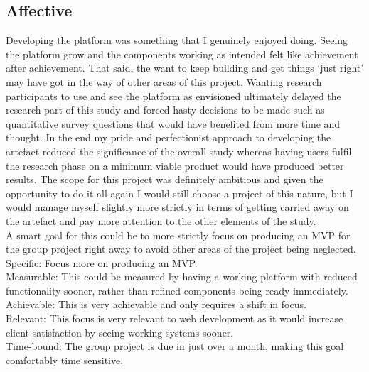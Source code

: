 \documentclass[lettersize,journal]{IEEEtran}
\begin{document}
\subsection{Affective}
Developing the platform was something that I genuinely enjoyed doing. Seeing the platform grow and the components working as intended felt like achievement after achievement. That said, the want to keep 
building and get things `just right' may have got in the way of other areas of this project. Wanting research participants to use and see the platform as envisioned ultimately delayed the 
research part of this study and forced hasty decisions to be made such as quantitative survey questions that would have benefited from more time and thought. In the end my pride and perfectionist 
approach to developing the artefact reduced the significance of the overall study whereas having users fulfil the research phase on a minimum viable product would have produced better results.
The scope for this project was definitely ambitious and given the opportunity to do it all again I would still choose a project of this nature, but I would manage myself slightly more strictly in terms 
of getting carried away on the artefact and pay more attention to the other elements of the study.\\ A smart goal for this could be to more strictly focus on producing an MVP for the group project right
away to avoid other areas of the project being neglected.
\\Specific: Focus more on producing an MVP.
\\Measurable: This could be measured by having a working platform with reduced functionality sooner, rather than refined components being ready immediately.
\\Achievable: This is very achievable and only requires a shift in focus.
\\Relevant: This focus is very relevant to web development as it would increase client satisfaction by seeing working systems sooner.
\\Time-bound: The group project is due in just over a month, making this goal comfortably time sensitive.
\end{document}
